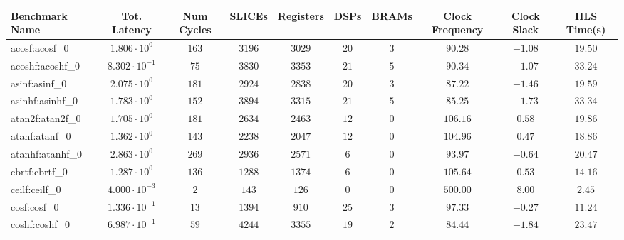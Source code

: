 \begin{tabular}{|l|c|c|c|c|c|c|c|c|c|}
\hline
Benchmark Name               & Tot. Latency            & Num Cycles & SLICEs    & Registers & DSPs    & BRAMs  & Clock Frequency & Clock Slack & HLS Time(s) \\
\hline
acosf:acosf\_0               & $ 1.806 \cdot 10^{0}  $ & $ 163    $ & $ 3196  $ & $ 3029  $ & $ 20  $ & $ 3  $ & $ 90.28       $ & $ -1.08   $ & $ 19.50   $ \\
acoshf:acoshf\_0             & $ 8.302 \cdot 10^{-1} $ & $ 75     $ & $ 3830  $ & $ 3353  $ & $ 21  $ & $ 5  $ & $ 90.34       $ & $ -1.07   $ & $ 33.24   $ \\
asinf:asinf\_0               & $ 2.075 \cdot 10^{0}  $ & $ 181    $ & $ 2924  $ & $ 2838  $ & $ 20  $ & $ 3  $ & $ 87.22       $ & $ -1.46   $ & $ 19.59   $ \\
asinhf:asinhf\_0             & $ 1.783 \cdot 10^{0}  $ & $ 152    $ & $ 3894  $ & $ 3315  $ & $ 21  $ & $ 5  $ & $ 85.25       $ & $ -1.73   $ & $ 33.34   $ \\
atan2f:atan2f\_0             & $ 1.705 \cdot 10^{0}  $ & $ 181    $ & $ 2634  $ & $ 2463  $ & $ 12  $ & $ 0  $ & $ 106.16      $ & $ 0.58    $ & $ 19.86   $ \\
atanf:atanf\_0               & $ 1.362 \cdot 10^{0}  $ & $ 143    $ & $ 2238  $ & $ 2047  $ & $ 12  $ & $ 0  $ & $ 104.96      $ & $ 0.47    $ & $ 18.86   $ \\
atanhf:atanhf\_0             & $ 2.863 \cdot 10^{0}  $ & $ 269    $ & $ 2936  $ & $ 2571  $ & $ 6   $ & $ 0  $ & $ 93.97       $ & $ -0.64   $ & $ 20.47   $ \\
cbrtf:cbrtf\_0               & $ 1.287 \cdot 10^{0}  $ & $ 136    $ & $ 1288  $ & $ 1374  $ & $ 6   $ & $ 0  $ & $ 105.64      $ & $ 0.53    $ & $ 14.16   $ \\
ceilf:ceilf\_0               & $ 4.000 \cdot 10^{-3} $ & $ 2      $ & $ 143   $ & $ 126   $ & $ 0   $ & $ 0  $ & $ 500.00      $ & $ 8.00    $ & $ 2.45    $ \\
cosf:cosf\_0                 & $ 1.336 \cdot 10^{-1} $ & $ 13     $ & $ 1394  $ & $ 910   $ & $ 25  $ & $ 3  $ & $ 97.33       $ & $ -0.27   $ & $ 11.24   $ \\
coshf:coshf\_0               & $ 6.987 \cdot 10^{-1} $ & $ 59     $ & $ 4244  $ & $ 3355  $ & $ 19  $ & $ 2  $ & $ 84.44       $ & $ -1.84   $ & $ 23.47   $ \\

\end{tabular}
